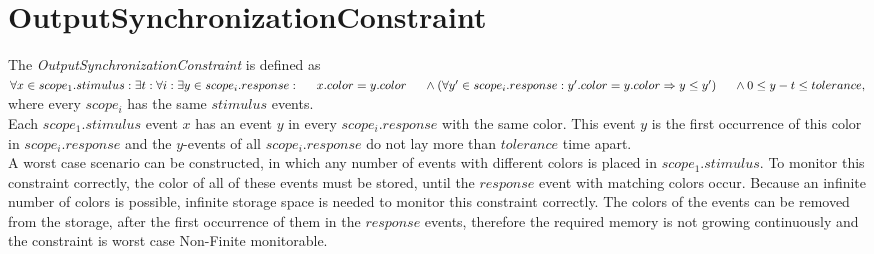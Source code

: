 \section{OutputSynchronizationConstraint}
	The \emph{OutputSynchronizationConstraint} is defined as\\[10pt]
	\begin{math}
		\forall x\in scope_1.stimulus: \exists t: \forall i: \exists y\in scope_i.response:\\
			\text{\hspace{.5cm}} x.color = y.color\\
			\text{\hspace{.5cm}}\land (\forall y'\in scope_i.response: y'.color=y.color \Rightarrow y\leq y')\\
			\text{\hspace{.5cm}}\land 0\leq y-t\leq tolerance,
	\end{math}\\[10pt]
	where every $scope_i$ has the same $stimulus$ events.\\
	Each $scope_1.stimulus$ event $x$ has an event $y$ in every $scope_i.response$ with the same color. This event $y$ is the first occurrence of this color in $scope_i.response$ and the $y$-events of all $scope_i.response$ do not lay more than $tolerance$ time apart.\\
	A worst case scenario can be constructed, in which any number of events with different colors is placed in $scope_1.stimulus$. To monitor this constraint correctly, the color of all of these events must be stored, until the $response$ event with matching colors occur. Because an infinite number of colors is possible, infinite storage space is needed to monitor this constraint correctly. The colors of the events can be removed from the storage, after the first occurrence of them in the $response$ events, therefore the required memory is not growing continuously and the constraint is worst case Non-Finite monitorable.
	
